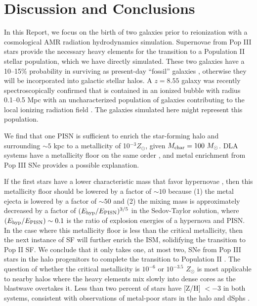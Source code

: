 \documentclass[12pt]{article}
\newcommand{\Ms}{\ifmmode{M_\odot}\else{$M_\odot$}\fi}
\newcommand\tento[1]{$10^{#1}$}
\begin{document}
\section*{Discussion and Conclusions}

In this Report, we focus on the birth of two galaxies prior to
reionization with a cosmological AMR radiation hydrodynamics
simulation.  Supernovae from Pop III stars provide the necessary heavy
elements for the transition to a Population II stellar population,
which we have directly simulated.  These two galaxies have a 10--15\%
probability in surviving as present-day ``fossil'' galaxies
\cite{Gnedin06}, otherwise they will be incorporated into galactic
stellar halos.  A $z=8.55$ galaxy was recently spectroscopically
confirmed that is contained in an ionized bubble with radius 0.1--0.5
Mpc with an uncharacterized population of galaxies contributing to the
local ionizing radiation field \cite{Lehnert10_z8.6}.  The galaxies
simulated here might represent this population.

We find that one PISN is sufficient to enrich the star-forming halo
and surrounding $\sim 5$ kpc to a metallicity of 10$^{-3} Z_\odot$,
given $M_{\rm char} = 100~\Ms$.  DLA systems have a metallicity floor
on the same order \cite{Wolfe05_Review}, and metal enrichment from Pop
III SNe provides a possible explanation.

If the first stars have a lower characteristic mass that favor
hypernovae \cite{Tumlinson07_IMF}, then this metallicity floor should
be lowered by a factor of $\sim 10$ because (1) the metal ejecta is
lowered by a factor of $\sim 50$ and (2) the mixing mass is
approximately decreased by a factor of $(E_{\rm hyp}/E_{\rm
  PISN})^{3/5}$ in the Sedov-Taylor solution, where $(E_{\rm
  hyp}/E_{\rm PISN}) \sim 0.1$ is the ratio of explosion energies of a
hypernova and PISN.  In the case where this metallicity floor is less
than the critical metallicity, then the next instance of SF will
further enrich the ISM, solidifying the transition to Pop II SF.  We
conclude that it only takes one, at most two, SNe from Pop III stars
in the halo progenitors to complete the transition to Population II
\cite{Frebel10}.  The question of whether the critical metallicity is
\tento{-6} or \tento{-3.5} $Z_\odot$ is most applicable to nearby
halos where the heavy elements mix slowly into dense cores as the
blastwave overtakes it.  Less than two percent of stars have [Z/H] $<
-3$ in both systems, consistent with observations of metal-poor stars
in the halo and dSphs \cite{Beers05, Battaglia10}.
\end{document}
